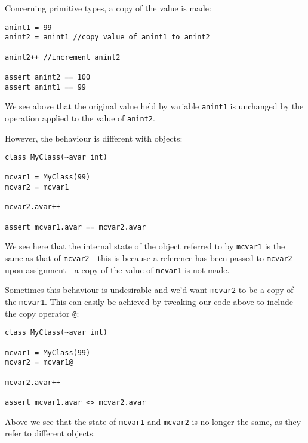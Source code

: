 \documentclass[conc-doc]{subfiles}
\begin{document}
Concerning primitive types, a copy of the value is made:
\begin{lstlisting}
anint1 = 99
anint2 = anint1 //copy value of anint1 to anint2

anint2++ //increment anint2

assert anint2 == 100
assert anint1 == 99
\end{lstlisting}

We see above that the original value held by variable \lstinline{anint1} is unchanged by the operation applied to the value of \lstinline{anint2}.

However, the behaviour is different with objects:
\begin{lstlisting}
class MyClass(~avar int)

mcvar1 = MyClass(99)
mcvar2 = mcvar1

mcvar2.avar++

assert mcvar1.avar == mcvar2.avar
\end{lstlisting}

We see here that the internal state of the object referred to by \lstinline{mcvar1} is the same as that of \lstinline{mcvar2} - this is because a reference has been passed to \lstinline{mcvar2} upon assignment - a copy of the value of \lstinline{mcvar1} is not made.

Sometimes this behaviour is undesirable and we'd want \lstinline{mcvar2} to be a copy of the \lstinline{mcvar1}. This can easily be achieved by tweaking our code above to include the copy operator \lstinline{@}:

\begin{lstlisting}
class MyClass(~avar int)

mcvar1 = MyClass(99)
mcvar2 = mcvar1@

mcvar2.avar++

assert mcvar1.avar <> mcvar2.avar
\end{lstlisting}

Above we see that the state of \lstinline{mcvar1} and \lstinline{mcvar2} is no longer the same, as they refer to different objects.
\end{document}
